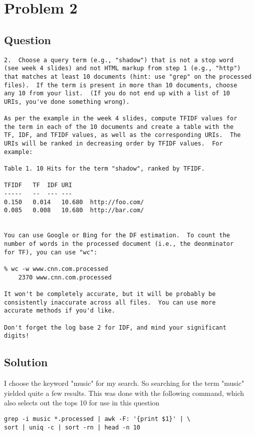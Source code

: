 \section{Problem 2}
\label{par21}
\subsection*{Question}
\begingroup

\begin{verbatim}
2.  Choose a query term (e.g., "shadow") that is not a stop word
(see week 4 slides) and not HTML markup from step 1 (e.g., "http")
that matches at least 10 documents (hint: use "grep" on the processed
files).  If the term is present in more than 10 documents, choose
any 10 from your list.  (If you do not end up with a list of 10
URIs, you've done something wrong).

As per the example in the week 4 slides, compute TFIDF values for
the term in each of the 10 documents and create a table with the
TF, IDF, and TFIDF values, as well as the corresponding URIs.  The
URIs will be ranked in decreasing order by TFIDF values.  For
example:

Table 1. 10 Hits for the term "shadow", ranked by TFIDF.

TFIDF	TF	IDF	URI
-----	--	---	---
0.150	0.014	10.680	http://foo.com/
0.085	0.008	10.680	http://bar.com/


You can use Google or Bing for the DF estimation.  To count the
number of words in the processed document (i.e., the deonminator
for TF), you can use "wc":

% wc -w www.cnn.com.processed
    2370 www.cnn.com.processed

It won't be completely accurate, but it will be probably be
consistently inaccurate across all files.  You can use more 
accurate methods if you'd like.  

Don't forget the log base 2 for IDF, and mind your significant
digits!

\end{verbatim}
\newpage
\subsection{Solution}

I choose the keyword "music" for my search. So searching for the term "music" yielded quite a few results. This was done with the following command, which also selects out the tops 10 for use in this question

\begin{lstlisting}[frame=single]
grep -i music *.processed | awk -F: '{print $1}' | \
sort | uniq -c | sort -rn | head -n 10
\end{lstlisting}

